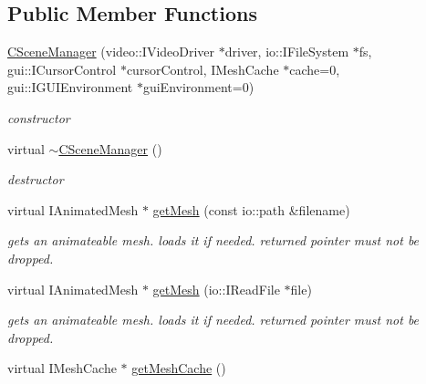 \subsection*{Public Member Functions}
\begin{DoxyCompactItemize}
\item 
\hypertarget{classirr_1_1scene_1_1_c_scene_manager_aed9a65def23a33a76228c37474d5ffdd}{\hyperlink{classirr_1_1scene_1_1_c_scene_manager_aed9a65def23a33a76228c37474d5ffdd}{C\-Scene\-Manager} (video\-::\-I\-Video\-Driver $\ast$driver, io\-::\-I\-File\-System $\ast$fs, gui\-::\-I\-Cursor\-Control $\ast$cursor\-Control, I\-Mesh\-Cache $\ast$cache=0, gui\-::\-I\-G\-U\-I\-Environment $\ast$gui\-Environment=0)}\label{classirr_1_1scene_1_1_c_scene_manager_aed9a65def23a33a76228c37474d5ffdd}

\begin{DoxyCompactList}\small\item\em constructor \end{DoxyCompactList}\item 
virtual \hyperlink{classirr_1_1scene_1_1_c_scene_manager_ad0e0be5012f1b923d7879f6a26f8bc5b}{$\sim$\-C\-Scene\-Manager} ()
\begin{DoxyCompactList}\small\item\em destructor \end{DoxyCompactList}\item 
\hypertarget{classirr_1_1scene_1_1_c_scene_manager_a357ecf36c404f8fe8d2a39b1e3ed9e6d}{virtual I\-Animated\-Mesh $\ast$ \hyperlink{classirr_1_1scene_1_1_c_scene_manager_a357ecf36c404f8fe8d2a39b1e3ed9e6d}{get\-Mesh} (const io\-::path \&filename)}\label{classirr_1_1scene_1_1_c_scene_manager_a357ecf36c404f8fe8d2a39b1e3ed9e6d}

\begin{DoxyCompactList}\small\item\em gets an animateable mesh. loads it if needed. returned pointer must not be dropped. \end{DoxyCompactList}\item 
\hypertarget{classirr_1_1scene_1_1_c_scene_manager_a423d718f359a90d8a7887577a8a4b42d}{virtual I\-Animated\-Mesh $\ast$ \hyperlink{classirr_1_1scene_1_1_c_scene_manager_a423d718f359a90d8a7887577a8a4b42d}{get\-Mesh} (io\-::\-I\-Read\-File $\ast$file)}\label{classirr_1_1scene_1_1_c_scene_manager_a423d718f359a90d8a7887577a8a4b42d}

\begin{DoxyCompactList}\small\item\em gets an animateable mesh. loads it if needed. returned pointer must not be dropped. \end{DoxyCompactList}\item 
\hypertarget{classirr_1_1scene_1_1_c_scene_manager_a34553414d755a09fae9a2eccf5e15290}{virtual I\-Mesh\-Cache $\ast$ \hyperlink{classirr_1_1scene_1_1_c_scene_manager_a34553414d755a09fae9a2eccf5e15290}{get\-Mesh\-Cache} ()}\label{classirr_1_1scene_1_1_c_scene_manager_a34553414d755a09fae9a2eccf5e15290}


\end{DoxyCompactItemize}
